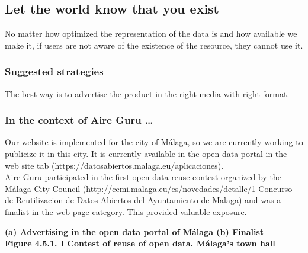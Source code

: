 \subsection{Let the world know that you exist}

No matter how optimized the representation of the data is and how available we make it, if users are not aware
of the existence of the resource, they cannot use it.

\subsubsection*{Suggested strategies} 

The best way is to advertise the product in the right media with right format.

\subsubsection*{In the context of Aire Guru \ldots}

Our website is implemented for the city of Málaga, so we are currently working to publicize it in this city.
It is currently available in the open data portal in the web site tab (https://datosabiertos.malaga.eu/aplicaciones). \\

Aire Guru participated in the first open data reuse contest organized by the Málaga City Council (http://cemi.malaga.eu/es/novedades/detalle/1-Concurso-de-Reutilizacion-de-Datos-Abiertos-del-Ayuntamiento-de-Malaga)
and was a finalist in the web page category. This provided valuable exposure.

\begin{center}
    \bf{ (a) Advertising in the open data portal of Málaga     (b) Finalist   \\
    Figure 4.5.1. I Contest of reuse of open data. Málaga's town hall}
\end{center}